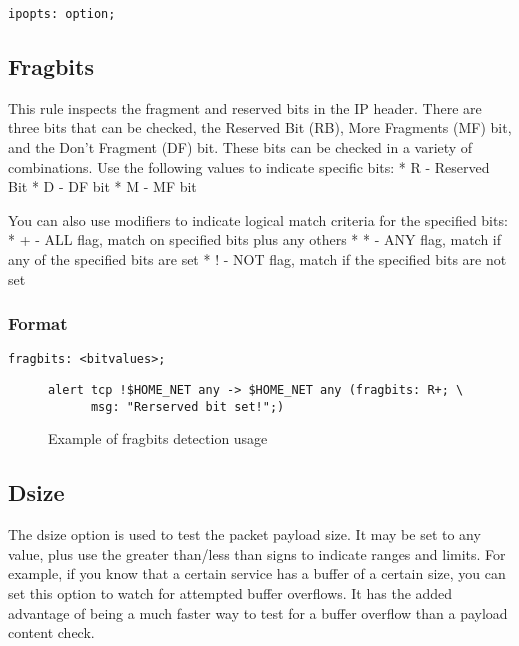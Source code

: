 \documentclass[english]{report}
\begin{document}
\begin{verbatim}
ipopts: option;
\end{verbatim}

\subsection{Fragbits}

This rule inspects the fragment and reserved bits in the IP header.
There are three bits that can be checked, the Reserved Bit (RB), More
Fragments (MF) bit, and the Don't Fragment (DF) bit. These bits can
be checked in a variety of combinations. Use the following values
to indicate specific bits: {*} R - Reserved Bit {*} D - DF bit {*}
M - MF bit

You can also use modifiers to indicate logical match criteria for
the specified bits: {*} + - ALL flag, match on specified bits plus
any others {*} {*} - ANY flag, match if any of the specified bits
are set {*} ! - NOT flag, match if the specified bits are not set


\subsubsection{Format}

\begin{verbatim}
fragbits: <bitvalues>;
\end{verbatim}
%
\begin{figure}[!hbpt]
\begin{verbatim}
alert tcp !$HOME_NET any -> $HOME_NET any (fragbits: R+; \
      msg: "Rerserved bit set!";)
\end{verbatim}
\caption{Example of fragbits detection usage\label{frabits example}}
\end{figure}



\subsection{Dsize}

The dsize option is used to test the packet payload size. It may be
set to any value, plus use the greater than/less than signs to indicate
ranges and limits. For example, if you know that a certain service
has a buffer of a certain size, you can set this option to watch for
attempted buffer overflows. It has the added advantage of being a
much faster way to test for a buffer overflow than a payload content
check.
\end{document}
